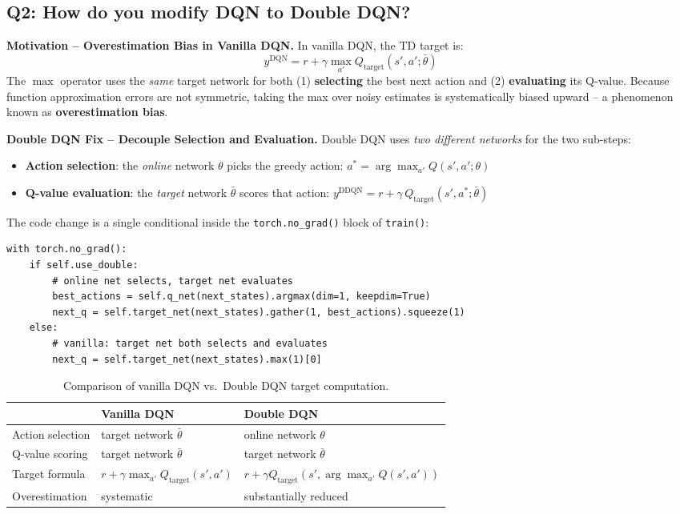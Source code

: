 \documentclass[12pt, a4paper]{report}
\begin{document}
\subsection*{Q2: How do you modify DQN to Double DQN?}

\textbf{Motivation -- Overestimation Bias in Vanilla DQN.}
In vanilla DQN, the TD target is:
\[
  y^\text{DQN} = r + \gamma \max_{a'} Q_\text{target}(s',a';\bar{\theta})
\]
The $\max$ operator uses the \emph{same} target network for both (1) \textbf{selecting} the best
next action and (2) \textbf{evaluating} its Q-value. Because function approximation errors are not
symmetric, taking the max over noisy estimates is systematically biased upward -- a phenomenon known
as \textbf{overestimation bias}.

\textbf{Double DQN Fix -- Decouple Selection and Evaluation.}
Double DQN \cite{hasselt2016} uses \emph{two different networks} for the two sub-steps:
\begin{itemize}
  \item \textbf{Action selection}: the \emph{online} network $\theta$ picks the greedy action:
        $a^* = \arg\max_{a'} Q(s',a';\theta)$
  \item \textbf{Q-value evaluation}: the \emph{target} network $\bar{\theta}$ scores that action:
        $y^\text{DDQN} = r + \gamma\, Q_\text{target}(s',a^*;\bar{\theta})$
\end{itemize}

The code change is a single conditional inside the \texttt{torch.no\_grad()} block of \texttt{train()}:
\begin{lstlisting}[caption={Double DQN vs. vanilla DQN target computation.}]
with torch.no_grad():
    if self.use_double:
        # online net selects, target net evaluates
        best_actions = self.q_net(next_states).argmax(dim=1, keepdim=True)
        next_q = self.target_net(next_states).gather(1, best_actions).squeeze(1)
    else:
        # vanilla: target net both selects and evaluates
        next_q = self.target_net(next_states).max(1)[0]
\end{lstlisting}

\begin{table}[H]
\centering
\caption{Comparison of vanilla DQN vs.\ Double DQN target computation.}
\begin{tabular}{lll}
\toprule
                  & \textbf{Vanilla DQN}          & \textbf{Double DQN} \\
\midrule
Action selection  & target network $\bar{\theta}$    & online network $\theta$ \\
Q-value scoring   & target network $\bar{\theta}$    & target network $\bar{\theta}$ \\
Target formula    & $r+\gamma\max_{a'} Q_\text{target}(s',a')$ & $r+\gamma Q_\text{target}(s',\arg\max_{a'} Q(s',a'))$ \\
Overestimation    & systematic                   & substantially reduced \\
\bottomrule
\end{tabular}
\end{table}
\end{document}
